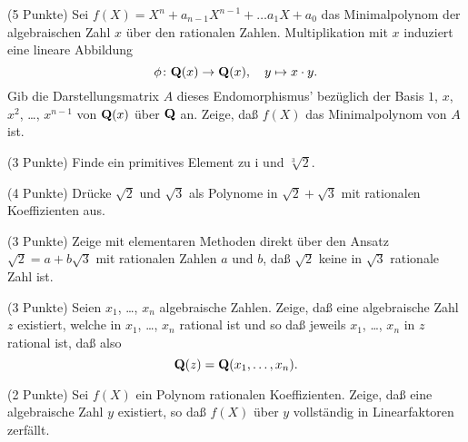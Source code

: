 \documentclass{algsheet}
\begin{document}
\begin{exercise}(5 Punkte)\newline
    Sei \(f(X) = X^n + a_{n - 1} X^{n - 1} + \dots a_1 X + a_0\) das Minimalpolynom
    der algebraischen Zahl \(x\) über den rationalen Zahlen. Multiplikation
    mit \(x\) induziert eine lineare Abbildung
    \[
        \phi\colon \mathbf Q(x) \to \mathbf Q(x),\quad y \mapsto x \cdot y.
    \]
    Gib die Darstellungsmatrix \(A\) dieses Endomorphismus' bezüglich der Basis
    \(1\), \(x\), \(x^2\), \dots, \(x^{n - 1}\) von \(\mathbf Q(x)\) über
    \(\mathbf Q\) an. Zeige, daß \(f(X)\) das Minimalpolynom von \(A\) ist.
\end{exercise}




\begin{exercise}(3 Punkte)\newline
    Finde ein primitives Element zu \(\mathrm i\) und \(\sqrt[3] 2\).
\end{exercise}

\begin{exercise}(4 Punkte)\newline
    Drücke \(\sqrt 2\) und \(\sqrt 3\) als Polynome in \(\sqrt 2 + \sqrt 3\) 
    mit rationalen Koeffizienten aus.
\end{exercise}

\begin{exercise}(3 Punkte)\newline
    Zeige mit elementaren Methoden direkt über den Ansatz
    \(\sqrt 2 = a + b \sqrt 3\) mit rationalen Zahlen \(a\) und \(b\), daß
    \(\sqrt 2\) keine in \(\sqrt 3\) rationale Zahl ist.
\end{exercise}

\begin{exercise}(3 Punkte)\newline
    Seien \(x_1\), \dots, \(x_n\) algebraische Zahlen. Zeige, daß eine algebraische
    Zahl \(z\) existiert, welche in \(x_1\), \dots,
    \(x_n\) rational ist und so daß jeweils \(x_1\), \dots, \(x_n\)
    in \(z\) rational ist, daß also
    \[
        \mathbf Q(z) = \mathbf Q(x_1, \dotsc, x_n).
    \]
\end{exercise}

\begin{exercise}(2 Punkte)\newline
    Sei \(f(X)\) ein Polynom rationalen Koeffizienten. Zeige, daß eine algebraische
    Zahl \(y\) existiert, so daß \(f(X)\) über \(y\) vollständig in Linearfaktoren
    zerfällt.
\end{exercise}
\end{document}
